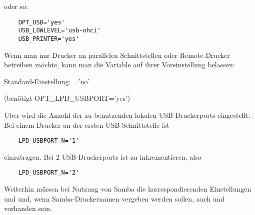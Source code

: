 \begin{description}
        oder so:

\begin{example}
\begin{verbatim}
    OPT_USB='yes'
    USB_LOWLEVEL='usb-ohci'
    USB_PRINTER='yes'
\end{verbatim}
\end{example}


    Wenn man nur Drucker an parallelen Schnittstellen oder Remote-Drucker
    betreiben möchte, kann man die Variable auf ihrer Voreinstellung
    belassen:

    Standard-Einstellung: ='no'


 (benötigt OPT\_LPD\_USBPORT='yes')

    Über  wird die Anzahl der zu benutzenden lokalen
    USB-Druckerports eingestellt. Bei einem Drucker an der ersten
    USB-Schnittstelle ist

\begin{example}
\begin{verbatim}
    LPD_USBPORT_N='1'
\end{verbatim}
\end{example}

    einzutragen. Bei 2 USB-Druckerports ist  zu inkrementieren,
    also

\begin{example}
\begin{verbatim}
    LPD_USBPORT_N='2'
\end{verbatim}
\end{example}

    Weiterhin müssen bei Nutzung von Samba die korrespondierenden
    Einstellungen  und 
    und, wenn Samba-Druckernamen vergeben werden sollen, auch
     und 
    vorhanden sein.


\end{description}
